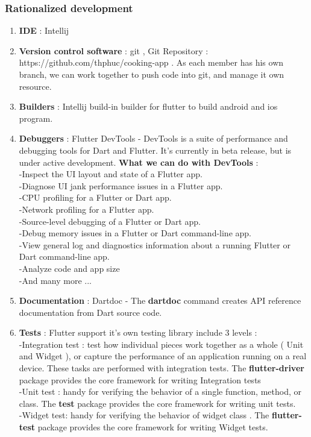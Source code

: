 \documentclass{article}
\begin{document}
\subsubsection{Rationalized development}
\begin{enumerate}

\item \textbf{IDE} : Intellij 
\item \textbf{Version control software}  : git , Git Repository : https://github.com/thphuc/cooking-app  . As each member has his own branch, we can work together to push code into git, and manage it own resource.
\item \textbf{Builders} : Intellij build-in builder for flutter to build android and ios program.
\item \textbf{Debuggers} : Flutter DevTools - DevTools is a suite of performance and debugging tools for Dart and Flutter. It’s currently in beta release, but is under active development.\textbf{ What we can do with DevTools } : \\
-Inspect the UI layout and state of a Flutter app. \\
-Diagnose UI jank performance issues in a Flutter app. \\
-CPU profiling for a Flutter or Dart app. \\
-Network profiling for a Flutter app. \\
-Source-level debugging of a Flutter or Dart app. \\
-Debug memory issues in a Flutter or Dart command-line app. \\
-View general log and diagnostics information about a running Flutter or Dart command-line app. \\
-Analyze code and app size \\
-And many more ... \\
\item \textbf{Documentation} : Dartdoc - The \textbf{dartdoc} command creates API reference documentation from Dart source code.
\item \textbf{Tests} : Flutter support it's own testing library include 3 levels :  \\
 -Integration test : test how individual pieces work together as a whole ( Unit and Widget ), or capture the performance of an application running on a real device. These tasks are performed with integration tests.  The \textbf{flutter-driver} package provides the core framework for writing Integration tests \\
 -Unit test :  handy for verifying the behavior of a single function, method, or class. The \textbf{test} package provides the core framework for writing unit tests. \\
 -Widget test: handy for verifying the behavior of widget class . The \textbf{flutter-test} package provides the core framework for writing Widget tests. \\
        

\end{enumerate}
\end{document}

